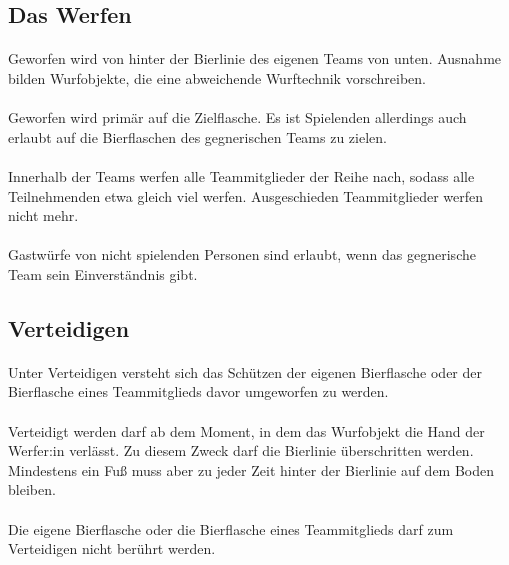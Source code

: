 \subsection{Das Werfen}
\paragraph{}
Geworfen wird von hinter der Bierlinie des eigenen Teams von unten.
Ausnahme bilden Wurfobjekte, die eine abweichende Wurftechnik vorschreiben.

\paragraph{}
Geworfen wird primär auf die Zielflasche.
Es ist Spielenden allerdings auch erlaubt auf die Bierflaschen des gegnerischen Teams zu zielen.

\paragraph{}
Innerhalb der Teams werfen alle Teammitglieder der Reihe nach, sodass alle Teilnehmenden etwa gleich viel werfen.
Ausgeschieden Teammitglieder werfen nicht mehr.

\paragraph{}
Gastwürfe von nicht spielenden Personen sind erlaubt, wenn das gegnerische Team sein Einverständnis gibt.

\subsection{Verteidigen}
\paragraph{}
Unter Verteidigen versteht sich das Schützen der eigenen Bierflasche oder der Bierflasche eines Teammitglieds davor umgeworfen zu werden.

\paragraph{}
Verteidigt werden darf ab dem Moment, in dem das Wurfobjekt die Hand der Werfer:in verlässt.
Zu diesem Zweck darf die Bierlinie überschritten werden.
Mindestens ein Fuß muss aber zu jeder Zeit hinter der Bierlinie auf dem Boden bleiben.

\paragraph{}
Die eigene Bierflasche oder die Bierflasche eines Teammitglieds darf zum Verteidigen nicht berührt werden.

